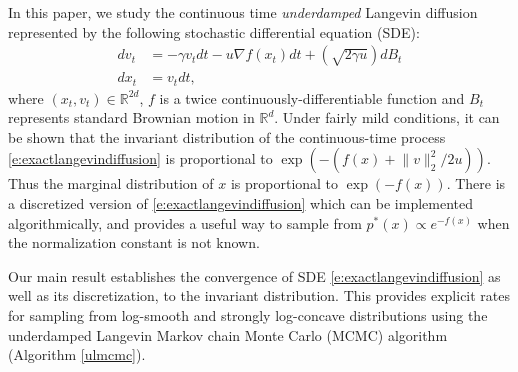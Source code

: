 %
%
%
%
%
%
In this paper, we study the continuous time \emph{underdamped} Langevin diffusion represented by the following stochastic differential equation (SDE):
\begin{align}\label{e:exactlangevindiffusion}
d v_t &= -\gamma v_t dt - u \nabla  f(x_t) dt + (\sqrt{2\gamma u}) dB_t \\
\nonumber d x_t &= v_t dt,
\end{align}
where $(x_t,v_t)\in \mathbb{R}^{2d}$, $f$ is a twice continuously-differentiable function and $B_t$ represents standard Brownian motion in $\mathbb{R}^d$. Under fairly mild conditions, it can be shown that the invariant distribution of the continuous-time process \eqref{e:exactlangevindiffusion} is proportional to $\exp(-(f(x)+ \lVert  v \rVert_2^2/2u))$. Thus the marginal distribution of $x$ is proportional to $\exp(-f(x))$. There is a discretized version of \eqref{e:exactlangevindiffusion} which can be implemented algorithmically, and provides a useful way to sample from $p^*(x) \propto e^{-f(x)}$ when the normalization constant is not known.

Our main result establishes the convergence of SDE \eqref{e:exactlangevindiffusion} as well as its discretization, to the invariant distribution. This provides explicit rates for sampling from log-smooth and strongly log-concave distributions using the underdamped Langevin Markov chain Monte Carlo (MCMC) algorithm (Algorithm \ref{ulmcmc}).  

